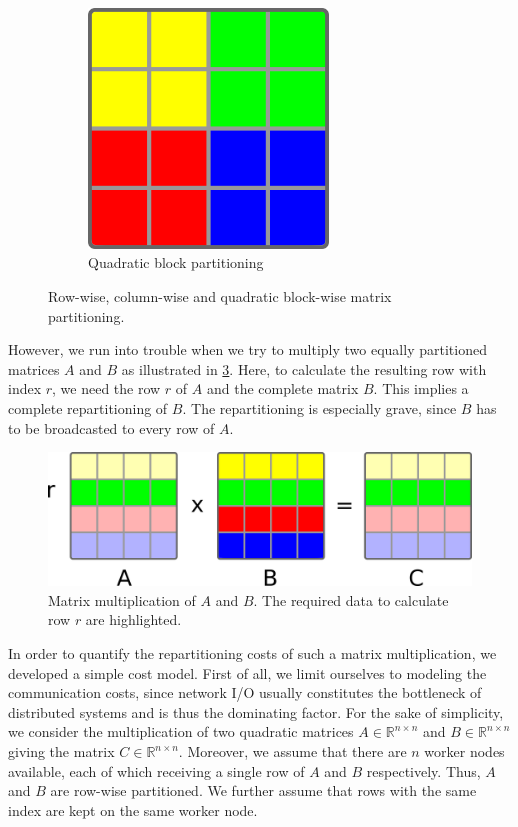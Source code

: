 \begin{figure}
\begin{subfigure}{.3\linewidth}
		\includegraphics[width=0.7\textwidth]{images/quadraticBlockPartitioning.png}
		\caption{Quadratic block partitioning}
		\label{fig:quadraticBlockPartitioning}
	\end{subfigure}
	\caption{Row-wise, column-wise and quadratic block-wise matrix partitioning.}
	\label{fig:Partitionings}
\end{figure}

However, we run into trouble when we try to multiply two equally partitioned matrices $A$ and $B$ as illustrated in \cref{fig:rowPartitioningMM}.
Here, to calculate the resulting row with index $r$, we need the row $r$ of $A$ and the complete matrix $B$.
This implies a complete repartitioning of $B$.
The repartitioning is especially grave, since $B$ has to be broadcasted to every row of $A$.

\begin{figure}[!h]
	\centering
	\includegraphics[width=0.7\linewidth]{images/rowMM.png}
	\caption{Matrix multiplication of $A$ and $B$. The required data to calculate row $r$ are highlighted.}
	\label{fig:rowPartitioningMM}
\end{figure}

In order to quantify the repartitioning costs of such a matrix multiplication, we developed a simple cost model.
First of all, we limit ourselves to modeling the communication costs, since network I/O usually constitutes the bottleneck of distributed systems and is thus the dominating factor.
For the sake of simplicity, we consider the multiplication of two quadratic matrices $A \in \mathbb{R}^{n\times n}$ and $B \in \mathbb{R}^{n\times n}$ giving the matrix $C\in \mathbb{R}^{n \times n}$.
Moreover, we assume that there are $n$ worker nodes available, each of which receiving a single row of $A$ and $B$ respectively.
Thus, $A$ and $B$ are row-wise partitioned.
We further assume that rows with the same index are kept on the same worker node.

